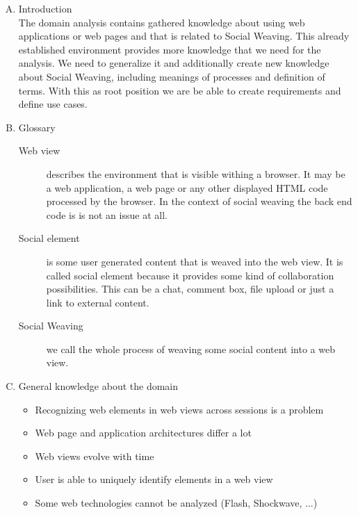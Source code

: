 \begin{enumerate}[A.]
\item Introduction\\
The domain analysis contains gathered knowledge about using web applications or web pages and that is related to Social Weaving. This already established environment provides more knowledge that we need for the analysis. We  need to generalize it and additionally create new knowledge about Social Weaving, including meanings of processes and definition of terms. With this as root position we are be able to create requirements and define use cases. 
	
\item Glossary
\begin{description}
	\item[Web view] describes the environment that is visible withing a browser. It may be a web application, a web page or any other displayed HTML code processed by the browser. In the context of social weaving the back end code is is not an issue at all. 
	
	\item[Social element] is some user generated content that is weaved into the web view. It is called social element because it provides some kind of collaboration possibilities. This can be a chat, comment box, file upload or just a link to external content.
	
	\item[Social Weaving] we call the whole process of weaving some social content into a web view. 
\end{description}
	
\item General knowledge about the domain\\
\begin{itemize}
	\item Recognizing web elements in web views across sessions is a problem
	\item Web page and application architectures differ a lot
	\item Web views evolve with time
	\item User is able to uniquely identify elements in a web view
	\item Some web technologies cannot be analyzed (Flash, Shockwave, ...)
\end{itemize}


\end{enumerate}
